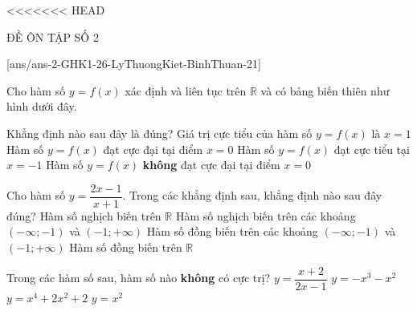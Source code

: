 <<<<<<< HEAD
\begin{name}
	{\tenchude}
	{\tendethi}
	{ĐỀ ÔN TẬP SỐ 2}
	{\thoigian}
\end{name}
	\setcounter{ex}{0}\setcounter{bt}{0}
	[ans/ans-2-GHK1-26-LyThuongKiet-BinhThuan-21]
\begin{ex}%
Cho hàm số $y=f(x)$ xác định và liên tục trên $\mathbb{R}$ và có bảng biến thiên như hình dưới đây.
\begin{center}
\end{center}
 Khẳng định nào sau đây là đúng?
\choice
{Giá trị cực tiểu của hàm số $y=f(x)$ là $x=1$}
{\True Hàm số $y=f(x)$ đạt cực đại tại điểm $x=0$}
{Hàm số $y=f(x)$ đạt cực tiểu tại $x=-1$}
{Hàm số $y=f(x)$ {\bf không} đạt cực đại tại điểm $x=0$}
\end{ex}
\begin{ex}%
Cho hàm số $y=\dfrac{2x-1}{x+1}$. Trong các khẳng định sau, khẳng định nào sau đây đúng?
\choice
{Hàm số nghịch biến trên $\mathbb{R}$}
{Hàm số nghịch biến trên các khoảng $(-\infty; -1)$ và $(-1;+\infty)$}
{\True Hàm số đồng biến trên các khoảng $(-\infty; -1)$ và $(-1;+\infty)$}
{Hàm số đồng biến trên $\mathbb{R}$}
\end{ex}
\begin{ex}%
Trong các hàm số sau, hàm số nào {\bf không} có cực trị?
\choice
{\True $y=\dfrac{x+2}{2x-1}$}
{$y=-x^3-x^2$}
{$y=x^4+2x^2+2$}
{$y=x^2$}
\end{ex}
